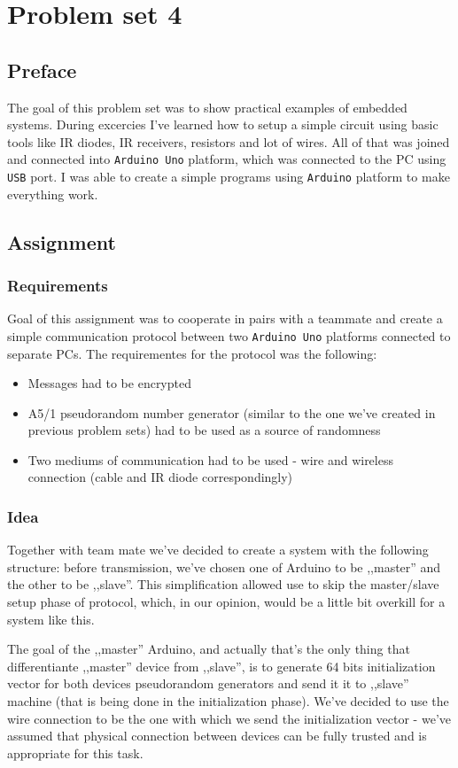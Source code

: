 \section{Problem set 4}
\subsection{Preface}

The goal of this problem set was to show practical examples of embedded systems.
During excercies I've learned how to setup a simple circuit using basic tools
like IR diodes, IR receivers, resistors and lot of wires. All of that was joined
and connected into \texttt{Arduino Uno} platform, which was connected to the PC
using \texttt{USB} port. I was able to create a simple programs using
\texttt{Arduino} platform to make everything work.

\subsection{Assignment}
\subsubsection{Requirements}
Goal of this assignment was to cooperate in pairs with a teammate and create a simple communication protocol between two \texttt{Arduino Uno} platforms connected to separate PCs. The requirementes for the protocol was the following:
\begin{itemize}
  \item Messages had to be encrypted
  \item A5/1 pseudorandom number generator (similar to the one we've created in previous problem sets) had to be used as a source of randomness
  \item Two mediums of communication had to be used - wire and wireless connection (cable and IR diode correspondingly) 
\end{itemize} 
\subsubsection{Idea}
Together with team mate we've decided to create a system with the following structure: before transmission, we've chosen one of Arduino to be ,,master'' and the other to be ,,slave''. This simplification allowed use to skip the master/slave setup phase of protocol, which, in our opinion, would be a little bit overkill for a system like this.

The goal of the ,,master'' Arduino, and actually that's the only thing that differentiante ,,master'' device from ,,slave'', is to generate 64 bits initialization vector for both devices pseudorandom generators and send it it to ,,slave'' machine (that is being done in the initialization phase).  We've decided to use the wire connection to be the one with which we send the initialization vector - we've assumed that physical connection between devices can be fully trusted and is appropriate for this task.


